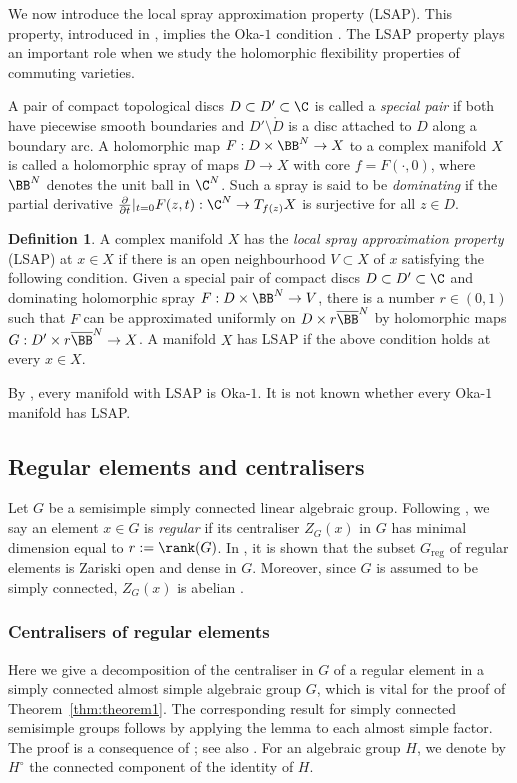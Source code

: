 \documentclass[12pt, a4paper, oneside]{amsart}
\theoremstyle{plain} %
\theoremstyle{definition} %
\newtheorem{definition}[theorem]{Definition}
\theoremstyle{remark} %
\begin{document}
We now introduce the local spray approximation property (LSAP). This property, introduced in \cite{AF25}, implies the Oka-$1$ condition \cite{AF25}. The LSAP property plays an important role when we study the holomorphic flexibility properties of commuting varieties.

A pair of compact topological discs $D\subset D'\subset \C$ is called a \emph{special pair} if both have piecewise smooth boundaries and $D'\setminus \mathring{D} $ is a disc attached to $D$ along a boundary arc. A holomorphic map $F:D\times \BB^N \to X$ to a complex manifold $X$ is called a holomorphic spray of maps $D\to X$ with core $f= F(\cdot,0)$, where $\BB^N$ denotes the unit ball in $\C^N$. Such a spray is said to be \emph{dominating} if the partial derivative $\frac{\partial}{\partial t}|_{t=0}F(z,t):\C^N\to T_{f(z)}X$ is surjective for all $z\in D$.

\begin{definition}
A complex manifold $X$ has the \emph{local spray approximation property} (LSAP) at $x\in X$ if there is an open neighbourhood $V\subset X$ of $x$ satisfying the following condition. Given a special pair of compact discs $D\subset D'\subset \C$ and dominating holomorphic spray $F:D\times \BB^N\to V$, there is a number $r\in (0,1)$ such that  $F$ can be approximated uniformly on $D\times r \overline{\BB}^N$ by holomorphic maps $G:D'\times  r\overline{\BB}^N \to X$. A manifold $X$ has LSAP if the above condition holds at every $x\in X$. 
\end{definition}

By \cite[Proposition 7.13 (b)]{AF25}, every manifold with LSAP is Oka-$1$. It is not known whether every Oka-$1$ manifold has LSAP.


\subsection{Regular elements and centralisers}

Let $G$ be a semisimple simply connected linear algebraic group. Following \cite{Ste65}, we say an element $x\in G$ is \emph{regular} if its centraliser $Z_G(x)$ in $G$ has minimal dimension equal to $r:=\rank(G)$. In \cite{Ste65}, it is shown that the subset $G_{\mathrm{reg}}$ of regular elements is Zariski open and dense in $G$. Moreover, since $G$ is assumed to be simply connected, $Z_G(x)$ is abelian \cite[Theorem D]{Kur78}.

\subsubsection{Centralisers of regular elements}
Here we give a decomposition of the centraliser in $G$ of a regular element in a simply connected almost simple algebraic group $G$, which is vital for the proof of Theorem~\ref{thm:theorem1}. The corresponding result for simply connected semisimple groups follows by applying the lemma to each almost simple factor. The proof is a consequence of \cite[Remark 3]{Som98}; see also \cite[Lemma 34]{MS03}.
For an algebraic group $H$, we denote by $H^\circ$ the connected component of the identity of $H$.
\end{document}
